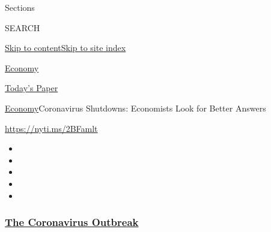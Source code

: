 Sections

SEARCH

\protect\hyperlink{site-content}{Skip to
content}\protect\hyperlink{site-index}{Skip to site index}

\href{https://www.nytimes3xbfgragh.onion/section/business/economy}{Economy}

\href{https://myaccount.nytimes3xbfgragh.onion/auth/login?response_type=cookie\&client_id=vi}{}

\href{https://www.nytimes3xbfgragh.onion/section/todayspaper}{Today's
Paper}

\href{/section/business/economy}{Economy}\textbar{}Coronavirus
Shutdowns: Economists Look for Better Answers

\url{https://nyti.ms/2BFamlt}

\begin{itemize}
\item
\item
\item
\item
\item
\end{itemize}

\hypertarget{the-coronavirus-outbreak}{%
\subsubsection{\texorpdfstring{\href{https://www.nytimes3xbfgragh.onion/news-event/coronavirus?name=styln-coronavirus-markets\&region=TOP_BANNER\&variant=undefined\&block=storyline_menu_recirc\&action=click\&pgtype=Article\&impression_id=e07b1660-e385-11ea-a6bd-919622e83b69}{The
Coronavirus
Outbreak}}{The Coronavirus Outbreak}}\label{the-coronavirus-outbreak}}

